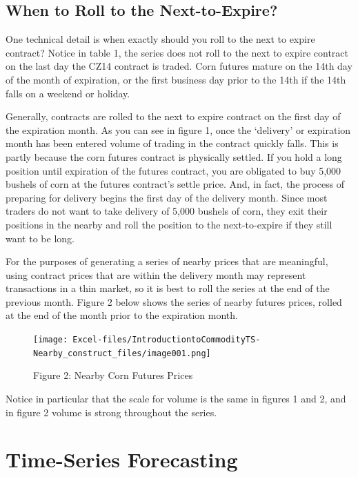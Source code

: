 \documentclass[
  letterpaper,
  DIV=11,
  numbers=noendperiod]{scrreprt}
\begin{document}
\subsection{When to Roll to the
Next-to-Expire?}\label{when-to-roll-to-the-next-to-expire}

One technical detail is when exactly should you roll to the next to
expire contract? Notice in table 1, the series does not roll to the next
to expire contract on the last day the CZ14 contract is traded. Corn
futures mature on the 14th day of the month of expiration, or the first
business day prior to the 14th if the 14th falls on a weekend or
holiday.

Generally, contracts are rolled to the next to expire contract on the
first day of the expiration month. As you can see in figure 1, once the
`delivery' or expiration month has been entered volume of trading in the
contract quickly falls. This is partly because the corn futures contract
is physically settled. If you hold a long position until expiration of
the futures contract, you are obligated to buy 5,000 bushels of corn at
the futures contract's settle price. And, in fact, the process of
preparing for delivery begins the first day of the delivery month. Since
most traders do not want to take delivery of 5,000 bushels of corn, they
exit their positions in the nearby and roll the position to the
next-to-expire if they still want to be long.

For the purposes of generating a series of nearby prices that are
meaningful, using contract prices that are within the delivery month may
represent transactions in a thin market, so it is best to roll the
series at the end of the previous month. Figure 2 below shows the series
of nearby futures prices, rolled at the end of the month prior to the
expiration month.

\begin{figure}[H]

{\centering \texttt{[image: Excel-files/IntroductiontoCommodityTS-Nearby\_construct\_files/image001.png]}

}

\caption{Figure 2: Nearby Corn Futures Prices}

\end{figure}%

Notice in particular that the scale for volume is the same in figures 1
and 2, and in figure 2 volume is strong throughout the series.

\section{Time-Series Forecasting}\label{time-series-forecasting}
\end{document}
